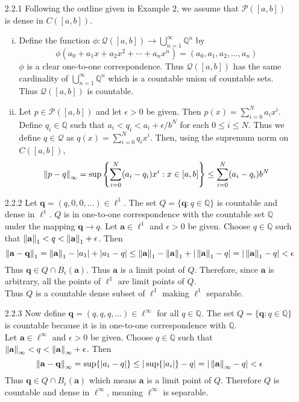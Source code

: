 \documentclass[../../Solutions.tex]{subfiles}
\begin{document}
\begin{itemize}
	\item [2.2.1] Following the outline given in Example 2, we assume that $\mathcal{P}([a,b])$ is dense in $C([a,b])$.
	\begin{enumerate}[(i)]
		\item Define the function $\phi : \mathcal{Q}([a,b]) \to \bigcup_{n=1}^\infty \mathbb{Q}^n$ by
			$$ \phi(a_0+a_1x+a_2x^2+\cdots + a_nx^n) = (a_0,a_1,a_2,\dots,a_n) $$
			$\phi$ is a clear one-to-one correspondence.
			Thus $\mathcal{Q}([a,b])$ has the same cardinality of $\bigcup_{n=1}^\infty \mathbb{Q}^n$ which is a countable union of countable sets.
			Thus $\mathcal{Q}([a,b])$ is countable.
		\item Let $p \in \mathcal{P}([a,b])$ and let $\epsilon > 0$ be given.
			Then $p(x) = \sum_{i=0}^N a_i x^i$.
			Define $q_i \in \mathbb{Q}$ such that $a_i < q_i < a_i+\epsilon/b^N$ for each $0 \leq i \leq N$.
			Thus we define $q \in \mathcal{Q}$ as $q(x) = \sum_{i=0}^N q_i x^i$.
			Then, using the supremum norm on $C([a,b])$,
			$$ \left\lVert p-q\right\rVert_\infty = \sup\left\{\sum_{i=0}^N (a_i-q_i)x^i : x \in [a,b]\right\} \leq \sum_{i=0}^N(a_i-q_i)b^N$$
	\end{enumerate}
	
	\item [2.2.2] Let $\mathbf{q} = (q,0,0,\dots) \in \ell^1$.
		The set $Q = \{\mathbf{q} : q \in \mathbb{Q} \}$ is countable and dense in $\ell^1$.
		$Q$ is in one-to-one correspondence with the countable set $\mathbb{Q}$ under the mapping $\mathbf{q} \to q$.
		Let $\mathbf{a} \in \ell^1$ and $\epsilon > 0$ be given.
		Choose $q \in \mathbb{Q}$ such that $\left\lVert\mathbf{a}\right\rVert_1 < q < \left\lVert\mathbf{a}\right\rVert_1 + \epsilon$.
		Then
		$$\left\lVert\mathbf{a}-\mathbf{q}\right\rVert_1 = \left\lVert\mathbf{a}\right\rVert_1-|a_1|+|a_1-q| \leq \left\lVert\mathbf{a}\right\rVert_1 - \left\lVert\mathbf{a}\right\rVert_1 + |\left\lVert\mathbf{a}\right\rVert_1 - q| = |\left\lVert\mathbf{a}\right\rVert_1-q| < \epsilon$$
		Thus $\mathbf{q} \in Q \cap B_\epsilon(\mathbf{a})$.
		Thus $\mathbf{a}$ is a limit point of $Q$.
		Therefore, since $\mathbf{a}$ is arbitrary, all the points of $\ell^1$ are limit points of $Q$. \\
		Thus $Q$ is a countable dense subset of $\ell^1$ making $\ell^1$ separable.
	
	\item [2.2.3] Now define $\mathbf{q} = (q,q,q,\dots) \in \ell^\infty$ for all $q \in \mathbb{Q}$.
		The set $Q = \{\mathbf{q} : q \in \mathbb{Q}\}$ is countable because it is in one-to-one correspondence with $\mathbb{Q}$. \\
		Let $\mathbf{a} \in \ell^\infty$ and $\epsilon > 0$ be given.
		Choose $q \in \mathbb{Q}$ such that $\left\lVert\mathbf{a}\right\rVert_\infty < q < \left\lVert\mathbf{a}\right\rVert_\infty + \epsilon$.
		Then
		$$ \left\lVert\mathbf{a}-\mathbf{q}\right\rVert_\infty = \sup\{|a_i-q|\} \leq |\sup\{|a_i|\}-q| = |\left\lVert\mathbf{a}\right\rVert_\infty-q| < \epsilon $$
		Thus $\mathbf{q} \in Q\cap B_\epsilon(\mathbf{a})$ which means $\mathbf{a}$ is a limit point of $Q$.
		Therefore $Q$ is countable and dense in $\ell^\infty$, meaning $\ell^\infty$ is separable.
	

\end{itemize}
\end{document}
